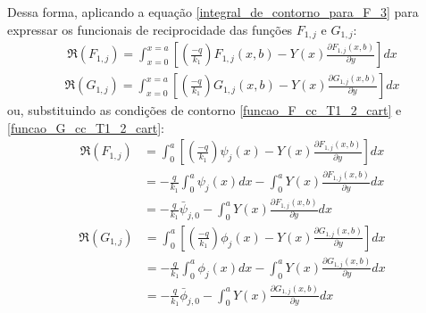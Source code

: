 Dessa forma, aplicando a equação \eqref{integral_de_contorno_para_F_3} para expressar os funcionais de reciprocidade das funções $F_{1,j}$ e $G_{1,j}$:
\begin{align}
\Re(F_{1,j})
=
\int_{x=0}^{x=a} \left[\left(\frac{-q}{k_1}\right)F_{1,j}(x, b) - Y(x)\frac{\partial F_{1,j}(x, b)}{\partial y}\right] dx
\label{integral_de_contorno_para_F1_0}
\end{align}
\begin{align}
\Re(G_{1,j})
=
\int_{x=0}^{x=a} \left[\left(\frac{-q}{k_1}\right)G_{1,j}(x, b) - Y(x)\frac{\partial G_{1,j}(x, b)}{\partial y}\right] dx
\label{integral_de_contorno_para_G1_0}
\end{align}
ou, substituindo as condições de contorno \eqref{funcao_F_cc_T1_2_cart} e \eqref{funcao_G_cc_T1_2_cart}:
\begin{align}
\Re(F_{1,j})
& =
\int_0^a \left[\left(\frac{-q}{k_1}\right)\psi_j(x) - Y(x)\frac{\partial F_{1,j}(x, b)}{\partial y}\right] dx \nonumber \\
& =
-\frac{q}{k_1}\int_0^a\psi_j(x)dx - \int_0^a Y(x)\frac{\partial F_{1,j}(x, b)}{\partial y} dx \nonumber \\
& =
-\frac{q}{k_1}\bar{\psi}_{j,0} - \int_0^a Y(x)\frac{\partial F_{1,j}(x, b)}{\partial y} dx
\label{integral_de_contorno_para_F1}
\end{align}
%
\begin{align}
\Re(G_{1,j})
& =
\int_0^a \left[\left(\frac{-q}{k_1}\right)\phi_j(x) - Y(x)\frac{\partial G_{1,j}(x, b)}{\partial y}\right] dx \nonumber \\
& =
-\frac{q}{k_1}\int_0^a\phi_j(x)dx - \int_0^a Y(x)\frac{\partial G_{1,j}(x, b)}{\partial y} dx
\nonumber \\
& =
-\frac{q}{k_1}\bar{\phi}_{j,0} - \int_0^a Y(x)\frac{\partial G_{1,j}(x, b)}{\partial y} dx
\label{integral_de_contorno_para_G1}
\end{align}

